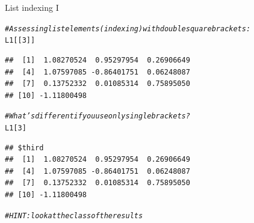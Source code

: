\documentclass[xcolor=table,           xcolor=dvipsnames]{beamer}\usepackage[]{graphicx}\usepackage[]{color}
\makeatletter
\newcommand{\hlnum}[1]{\textcolor[rgb]{0,0,0}{#1}}
\newcommand{\hlcom}[1]{\textcolor[rgb]{0,0.392,0}{\textit{#1}}}
\newcommand{\hlstd}[1]{\textcolor[rgb]{0,0,0}{#1}}
\newenvironment{kframe}{%
 \def\at@end@of@kframe{}%
 \ifinner\ifhmode%
  \def\at@end@of@kframe{\end{minipage}}%
  \begin{minipage}{\columnwidth}%
 \fi\fi%
 \def\FrameCommand##1{\hskip\@totalleftmargin \hskip-\fboxsep
 \colorbox{shadecolor}{##1}\hskip-\fboxsep
     \hskip-\linewidth \hskip-\@totalleftmargin \hskip\columnwidth}%
 \MakeFramed {\advance\hsize-\width
   \@totalleftmargin\z@ \linewidth\hsize
   \@setminipage}}%
 {\par\unskip\endMakeFramed%
 \at@end@of@kframe}
\newenvironment{knitrout}{}{} %
\makeatother
\begin{document}

\begin{frame}[fragile]{List indexing I}
\begin{knitrout}\small
{}\color{fgcolor}\begin{kframe}
\begin{alltt}
\hlcom{# Assessing list elements (indexing) with double square brackets:}
\hlstd{L1[[}\hlnum{3}\hlstd{]]}
\end{alltt}
\begin{verbatim}
##  [1]  1.08270524  0.95297954  0.26906649
##  [4]  1.07597085 -0.86401751  0.06248087
##  [7]  0.13752332  0.01085314  0.75895050
## [10] -1.11800498
\end{verbatim}
\end{kframe}
\end{knitrout}
\pause
\begin{knitrout}\small
{}\color{fgcolor}\begin{kframe}
\begin{alltt}
\hlcom{# What's different if you use only single brackets?}
\hlstd{L1[}\hlnum{3}\hlstd{]}
\end{alltt}
\begin{verbatim}
## $third
##  [1]  1.08270524  0.95297954  0.26906649
##  [4]  1.07597085 -0.86401751  0.06248087
##  [7]  0.13752332  0.01085314  0.75895050
## [10] -1.11800498
\end{verbatim}
\begin{alltt}
\hlcom{# HINT: look at the class of the results}
\end{alltt}
\end{kframe}
\end{knitrout}
\end{frame}

\end{document}
